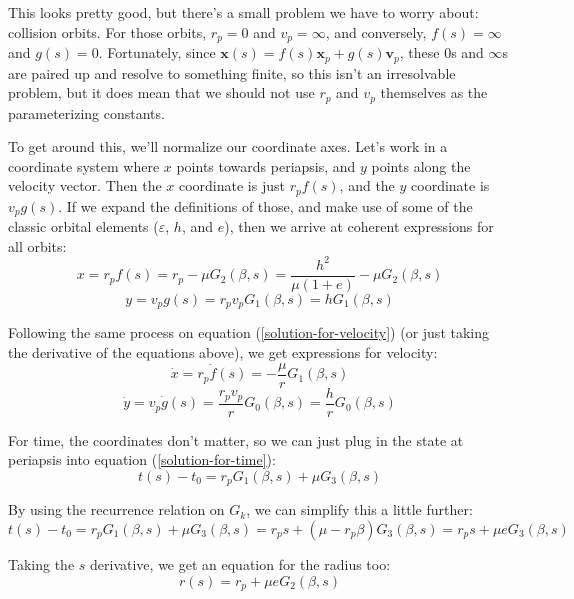 \documentclass{article}
\numberwithin{equation}{subsection}
\begin{document}
This looks pretty good, but there's a small problem we have to worry about: collision orbits. For those orbits, $r_p = 0$ and $v_p = \infty$, and conversely, $f(s) = \infty$ and $g(s) = 0$. Fortunately, since $\bm x(s) = f(s) \bm x_p + g(s) \bm v_p$, these $0$s and $\infty$s are paired up and resolve to something finite, so this isn't an irresolvable problem, but it does mean that we should not use $r_p$ and $v_p$ themselves as the parameterizing constants.

To get around this, we'll normalize our coordinate axes. Let's work in a coordinate system where $x$ points towards periapsis, and $y$ points along the velocity vector. Then the $x$ coordinate is just $r_p f(s)$, and the $y$ coordinate is $v_p g(s)$. If we expand the definitions of those, and make use of some of the classic orbital elements ($\varepsilon$, $h$, and $e$), then we arrive at coherent expressions for all orbits:
\begin{equation}
x = r_p f(s) = r_p - \mu G_2(\beta, s) = \frac{h^2}{\mu (1+e)} - \mu G_2(\beta, s)
\end{equation}
\begin{equation}
y = v_p g(s) = r_p v_p G_1(\beta, s) = h G_1(\beta, s)
\end{equation}

Following the same process on equation (\ref{solution-for-velocity}) (or just taking the derivative of the equations above), we get expressions for velocity:
\begin{equation}
\dot x = r_p \dot f(s) = - \frac{\mu}{r} G_1(\beta, s)
\end{equation}
\begin{equation}
\dot y = v_p \dot g(s) = \frac{r_p v_p}{r} G_0(\beta, s) = \frac{h}{r} G_0(\beta, s)
\end{equation}

For time, the coordinates don't matter, so we can just plug in the state at periapsis into equation (\ref{solution-for-time}):
\begin{equation}
t(s) - t_0 = r_p G_1(\beta, s) + \mu G_3(\beta, s)
\end{equation}

By using the recurrence relation on $G_k$, we can simplify this a little further:
\begin{equation}
t(s) - t_0 = r_p G_1(\beta, s) + \mu G_3(\beta, s) = r_p s + (\mu - r_p \beta) G_3(\beta, s) = r_p s + \mu e G_3(\beta, s)
\end{equation}

Taking the $s$ derivative, we get an equation for the radius too:
\begin{equation}
r(s) = r_p + \mu e G_2(\beta, s)
\end{equation}
\end{document}
